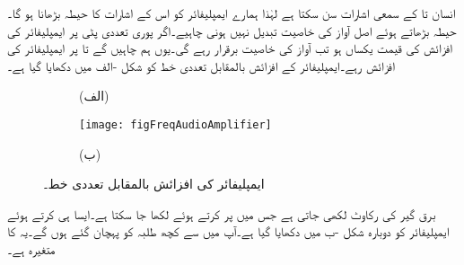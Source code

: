 انسان  تا  کے سمعی اشارات سن سکتا ہے لہٰذا ہمارے ایمپلیفائر کو اس  کے اشارات کا حیطہ بڑھانا ہو گا۔حیطہ بڑھاتے ہوئے اصل آواز کی خاصیت تبدیل نہیں ہونی چاہیے۔اگر پوری تعددی پٹی پر ایمپلیفائر کی افزائش  کی قیمت یکساں ہو تب آواز کی خاصیت برقرار رہے گی۔یوں ہم چاہیں گے   تا  پر ایمپلیفائر کی افزائش   رہے۔ایمپلیفائر کے افزائش بالمقابل تعددی خط  کو شکل -الف میں دکھایا گیا ہے۔
\begin{figure}
\centering
\begin{subfigure}{1\textwidth}
\centering
{}
\caption*{(الف)}
\end{subfigure}
\begin{subfigure}{1\textwidth}
\centering
\texttt{[image: figFreqAudioAmplifier]}
\caption*{(ب)}
\end{subfigure}
\caption{ایمپلیفائر کی افزائش بالمقابل تعددی خط۔}
\label{شکل_تعددی_افزائش_بالمقابل_تعددی_خط_ب}
\end{figure}

برق گیر کی رکاوٹ  لکھی جاتی ہے جس میں  پر کرتے ہوئے  لکھا جا سکتا ہے۔ایسا ہی کرتے ہوئے ایمپلیفائر کو دوبارہ شکل -ب میں دکھایا گیا ہے۔آپ میں سے کچھ طلبہ  کو پہچان گئے ہوں گے۔یہ  کا متغیرہ ہے۔

